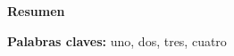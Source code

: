 \thispagestyle{plain}
\begin{center}
	\vspace*{1.5cm}
	{\Large \bfseries  Resumen}
\end{center}
\vspace{0.5cm}

\newline

\textbf{Palabras claves: } uno, dos, tres, cuatro
